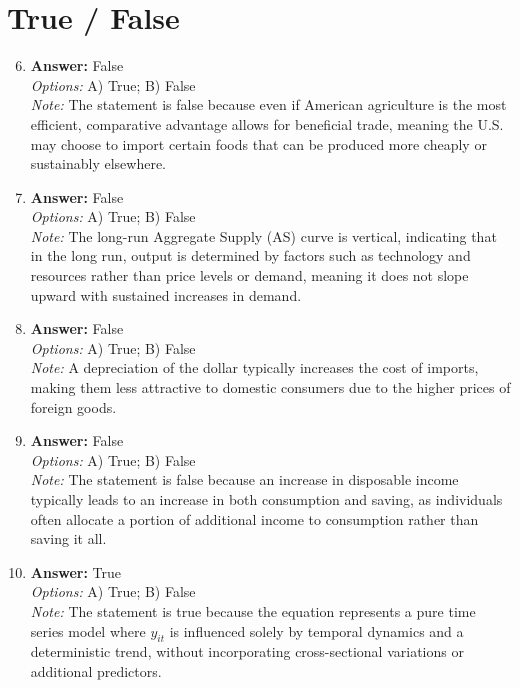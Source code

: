 \documentclass[12pt]{article}
\begin{document}
\section*{True / False}
\begin{enumerate}[label=\arabic*.]
\setcounter{enumi}{5}
\item \textbf{Answer:} False
\\ \textit{Options:} A) True; B) False
\\ \textit{Note:} The statement is false because even if American agriculture is the most efficient, comparative advantage allows for beneficial trade, meaning the U.S. may choose to import certain foods that can be produced more cheaply or sustainably elsewhere.
\item \textbf{Answer:} False
\\ \textit{Options:} A) True; B) False
\\ \textit{Note:} The long-run Aggregate Supply (AS) curve is vertical, indicating that in the long run, output is determined by factors such as technology and resources rather than price levels or demand, meaning it does not slope upward with sustained increases in demand.
\item \textbf{Answer:} False
\\ \textit{Options:} A) True; B) False
\\ \textit{Note:} A depreciation of the dollar typically increases the cost of imports, making them less attractive to domestic consumers due to the higher prices of foreign goods.
\item \textbf{Answer:} False
\\ \textit{Options:} A) True; B) False
\\ \textit{Note:} The statement is false because an increase in disposable income typically leads to an increase in both consumption and saving, as individuals often allocate a portion of additional income to consumption rather than saving it all.
\item \textbf{Answer:} True
\\ \textit{Options:} A) True; B) False
\\ \textit{Note:} The statement is true because the equation represents a pure time series model where $y_{it}$ is influenced solely by temporal dynamics and a deterministic trend, without incorporating cross-sectional variations or additional predictors.
\end{enumerate}
\end{document}
